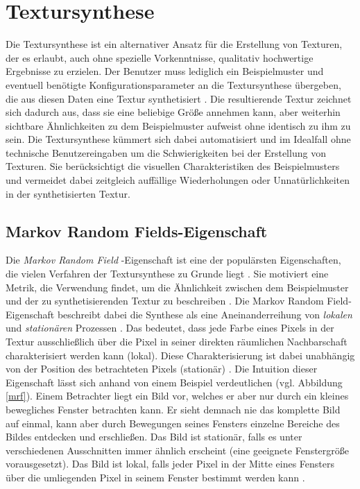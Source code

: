 \section{Textursynthese}

Die Textursynthese ist ein alternativer Ansatz für die Erstellung von Texturen, der es erlaubt, auch ohne spezielle Vorkenntnisse, qualitativ hochwertige Ergebnisse zu erzielen.
Der Benutzer muss lediglich ein Beispielmuster und eventuell benötigte Konfigurationsparameter an die Textursynthese übergeben, die aus diesen Daten eine Textur synthetisiert \cite{StateOfTheArt}.
Die resultierende Textur zeichnet sich dadurch aus, dass sie eine beliebige Größe annehmen kann, aber weiterhin sichtbare Ähnlichkeiten zu dem Beispielmuster aufweist ohne identisch zu ihm zu sein.
Die Textursynthese kümmert sich dabei automatisiert und im Idealfall ohne technische Benutzereingaben um die Schwierigkeiten bei der Erstellung von Texturen.
Sie berücksichtigt die visuellen Charakteristiken des Beispielmusters und vermeidet dabei zeitgleich auffällige Wiederholungen oder Unnatürlichkeiten in der synthetisierten Textur.

\subsection{\glqq Markov Random Fields\grqq -Eigenschaft}

Die \emph{\glqq Markov Random Field\grqq} -Eigenschaft ist eine der populärsten Eigenschaften, die vielen Verfahren der Textursynthese zu Grunde liegt \cite{StateOfTheArt}.
Sie motiviert eine Metrik, die Verwendung findet, um die Ähnlichkeit zwischen dem Beispielmuster und der zu synthetisierenden Textur zu beschreiben \cite{TextureOptimization}.
Die \glqq Markov Random Field\grqq -Eigenschaft beschreibt dabei die Synthese als eine Aneinanderreihung von \emph{lokalen} und \emph{stationären} Prozessen \cite{StateOfTheArt}.
Das bedeutet, dass jede Farbe eines Pixels in der Textur ausschließlich über die Pixel in seiner direkten räumlichen Nachbarschaft charakterisiert werden kann (lokal).
Diese Charakterisierung ist dabei unabhängig von der Position des betrachteten Pixels (stationär) \cite{TextureOptimization}.
Die Intuition dieser Eigenschaft lässt sich anhand von einem Beispiel verdeutlichen (vgl. Abbildung \ref{mrf}).
Einem Betrachter liegt ein Bild vor, welches er aber nur durch ein kleines bewegliches Fenster betrachten kann.
Er sieht demnach nie das komplette Bild auf einmal, kann aber durch Bewegungen seines Fensters einzelne Bereiche des Bildes entdecken und erschließen.
Das Bild ist stationär, falls es unter verschiedenen Ausschnitten immer ähnlich erscheint (eine geeignete Fenstergröße vorausgesetzt).
Das Bild ist lokal, falls jeder Pixel in der Mitte eines Fensters über die umliegenden Pixel in seinem Fenster bestimmt werden kann \cite{StateOfTheArt}.

